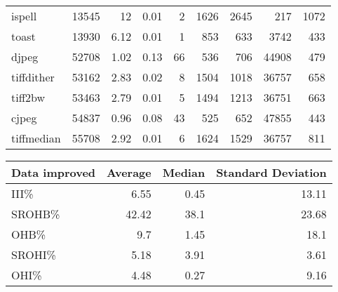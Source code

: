 \begin{tabular}{lrrrrrrrr}
 ispell          &          13545 &    12    &   0.01 &    2 &   1626 &         2645 &   217 &  1072 \\
 toast           &          13930 &     6.12 &   0.01 &    1 &    853 &          633 &  3742 &   433 \\
 djpeg           &          52708 &     1.02 &   0.13 &   66 &    536 &          706 & 44908 &   479 \\
 tiffdither      &          53162 &     2.83 &   0.02 &    8 &   1504 &         1018 & 36757 &   658 \\
 tiff2bw         &          53463 &     2.79 &   0.01 &    5 &   1494 &         1213 & 36751 &   663 \\
 cjpeg           &          54837 &     0.96 &   0.08 &   43 &    525 &          652 & 47855 &   443 \\
 tiffmedian      &          55708 &     2.92 &   0.01 &    6 &   1624 &         1529 & 36757 &   811 \\
\hline
\end{tabular}\begin{tabular}{lrrr}
\hline
 Data improved   &   Average &   Median &   Standard Deviation \\
\hline
 III\%            &      6.55 &     0.45 &                13.11 \\
 SROHB\%          &     42.42 &    38.1  &                23.68 \\
 OHB\%            &      9.7  &     1.45 &                18.1  \\
 SROHI\%          &      5.18 &     3.91 &                 3.61 \\
 OHI\%            &      4.48 &     0.27 &                 9.16 \\
\hline
\end{tabular}